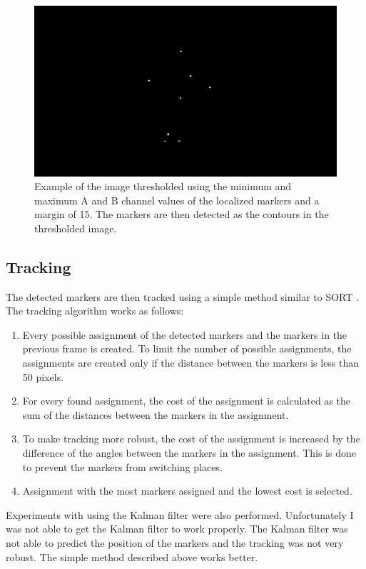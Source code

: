 \begin{figure}[htbp]
    \centering
    \includegraphics[width=\textwidth]{obrazky-figures/thresholded.png}
    \caption{Example of the image thresholded using the minimum and maximum A and B channel values of the localized markers and a margin of 15. The markers are then detected as the contours in the thresholded image.}
    \label{fig:marker_detection}
\end{figure}

\subsection{Tracking}
\label{tracking}
The detected markers are then tracked using a simple method similar to SORT \cite{sort}. The tracking algorithm works as follows:

\begin{enumerate}
    \item Every possible assignment of the detected markers and the markers in the previous frame is created. To limit the number of possible assignments, the assignments are created only if the distance between the markers is less than 50 pixels.
    \item For every found assignment, the cost of the assignment is calculated as the sum of the distances between the markers in the assignment.
    \item To make tracking more robust, the cost of the assignment is increased by the difference of the angles between the markers in the assignment. This is done to prevent the markers from switching places.
    \item Assignment with the most markers assigned and the lowest cost is selected.
\end{enumerate}

Experiments with using the Kalman filter were also performed. Unfortunately I was not able to get the Kalman filter to work properly. The Kalman filter was not able to predict the position of the markers and the tracking was not very robust. The simple method described above works better.

